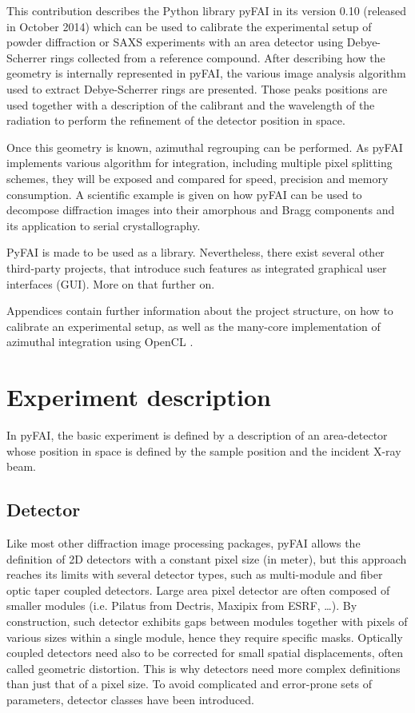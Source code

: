 \documentclass[preprint]{iucr}
\begin{document}
This contribution describes the Python library pyFAI in its version 0.10
(released in October 2014) which can be used to calibrate the experimental
setup of powder diffraction or SAXS experiments with an area
detector using Debye-Scherrer rings collected from a reference compound.
After describing how the geometry is internally represented in pyFAI, the
various image analysis algorithm used to extract Debye-Scherrer rings are presented.
Those peaks positions are used together with a description of the calibrant and the
wavelength of the radiation to perform the refinement of the detector position
in space.

Once this geometry is known, azimuthal regrouping can be performed.
As pyFAI implements various algorithm for integration, including
multiple pixel splitting schemes, they will be exposed and compared
for speed, precision and memory consumption.
A scientific example is given on how pyFAI can be used to decompose
diffraction images into their amorphous and Bragg components and its application
to serial crystallography.

PyFAI is made to be used as a library. Nevertheless, there exist several other
third-party projects, that introduce such features as integrated graphical user
interfaces (GUI). More on that further on.

Appendices contain further information about the project structure, 
on how to calibrate an experimental setup, as well as the many-core
implementation of azimuthal integration using OpenCL \cite{opencl}.

\section{Experiment description}

In pyFAI, the basic experiment is defined by a description of an area-detector whose 
position in space is defined by the sample position and the incident X-ray beam.

\subsection{Detector}
Like most other diffraction image processing packages, pyFAI allows the definition of
2D detectors with a constant pixel size (in meter), but this approach reaches its limits
with several detector types, such as multi-module and fiber optic taper coupled detectors. 
Large area pixel detector are often composed of smaller modules (i.e. Pilatus from Dectris,
 Maxipix from ESRF,
\ldots).
By construction, such detector exhibits gaps between modules together with
pixels of various sizes within a single module, hence they require specific masks.
Optically coupled detectors need also to be corrected
for small spatial displacements, often called geometric distortion.
This is why detectors need more complex definitions than just that of a pixel size. 
To avoid complicated and error-prone sets of parameters, detector classes have
been introduced.
\end{document}
